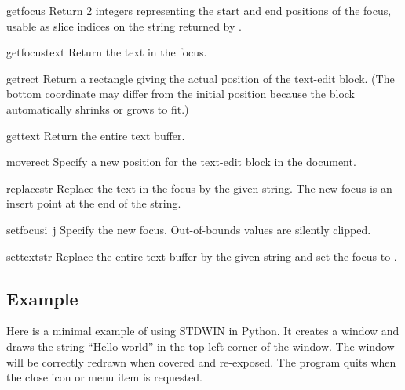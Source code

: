 \begin{funcdesc}{getfocus}{}
Return 2 integers representing the start and end positions of the
focus, usable as slice indices on the string returned by
.
\end{funcdesc}

\begin{funcdesc}{getfocustext}{}
Return the text in the focus.
\end{funcdesc}

\begin{funcdesc}{getrect}{}
Return a rectangle giving the actual position of the text-edit block.
(The bottom coordinate may differ from the initial position because
the block automatically shrinks or grows to fit.)
\end{funcdesc}

\begin{funcdesc}{gettext}{}
Return the entire text buffer.
\end{funcdesc}

\begin{funcdesc}{move}{rect}
Specify a new position for the text-edit block in the document.
\end{funcdesc}

\begin{funcdesc}{replace}{str}
Replace the text in the focus by the given string.
The new focus is an insert point at the end of the string.
\end{funcdesc}

\begin{funcdesc}{setfocus}{i\, j}
Specify the new focus.
Out-of-bounds values are silently clipped.
\end{funcdesc}

\begin{funcdesc}{settext}{str}
Replace the entire text buffer by the given string and set the focus
to .
\end{funcdesc}

\subsection{Example}

Here is a minimal example of using STDWIN in Python.
It creates a window and draws the string ``Hello world'' in the top
left corner of the window.
The window will be correctly redrawn when covered and re-exposed.
The program quits when the close icon or menu item is requested.

